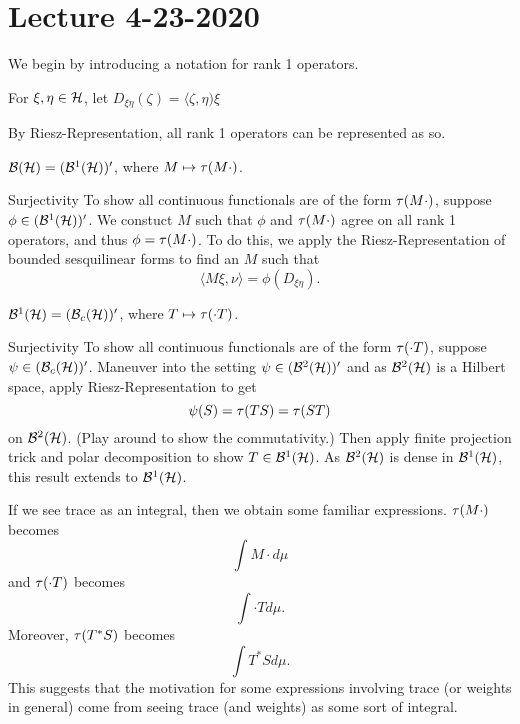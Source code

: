 \section{Lecture 4-23-2020}
We begin by introducing a notation for rank 1 operators.
\begin{dfn}
    For $\xi, \eta \in {\mathcal H}$, let $D_{\xi \eta}(\zeta) = \langle \zeta, \eta) \xi$
\end{dfn}
By Riesz-Representation, all rank 1 operators can be represented as so.
\begin{thm}
    ${\mathcal B}({\mathcal H}) = ({\mathcal B}^1({\mathcal H}))'$, where $M \mapsto \tau(M \cdot)$.
\end{thm}
\begin{details}{Surjectivity}
    To show all continuous functionals are of the form $\tau(M \cdot)$, suppose $\phi \in ({\mathcal B}^1({\mathcal H}))'$. We constuct $M$ such that $\phi$ and $\tau(M \cdot)$ agree on all rank 1 operators, and thus $\phi = \tau(M \cdot)$. To do this, we apply the Riesz-Representation of bounded sesquilinear forms to find an $M$ such that
    \[
        \langle M\xi, \nu \rangle = \phi(D_{\xi \eta}).
    \]
\end{details}
\begin{thm}
    ${\mathcal B}^1({\mathcal H}) = ({\mathcal B}_c({\mathcal H}))'$, where $T \mapsto \tau(\cdot T)$.
\end{thm}
\begin{details}{Surjectivity}
    To show all continuous functionals are of the form $\tau(\cdot T)$, suppose $\psi \in ({\mathcal B}_c({\mathcal H}))'$. Maneuver into the setting $\psi \in ({\mathcal B}^2({\mathcal H}))'$ and as ${\mathcal B}^2({\mathcal H})$ is a Hilbert space, apply Riesz-Representation to get
    \[
        \psi(S) = \tau(TS) = \tau(ST)
    \]
    on ${\mathcal B}^2({\mathcal H})$. (Play around to show the commutativity.) Then apply finite projection trick and polar decomposition to show $T \in {\mathcal B}^1({\mathcal H})$. As ${\mathcal B}^2({\mathcal H})$ is dense in ${\mathcal B}^1({\mathcal H})$, this result extends to ${\mathcal B}^1({\mathcal H})$.
\end{details}
\begin{remark}
    If we see trace as an integral, then we obtain some familiar expressions. $\tau(M\cdot)$ becomes
    \[
        \int M \cdot d\mu
    \]
    and $\tau(\cdot T)$ becomes
    \[
        \int \cdot T d\mu.
    \]
    Moreover, $\tau(T^*S)$ becomes
    \[
        \int T^*S d\mu.
    \]
    This suggests that the motivation for some expressions involving trace (or weights in general) come from seeing trace (and weights) as some sort of integral.
\end{remark}
